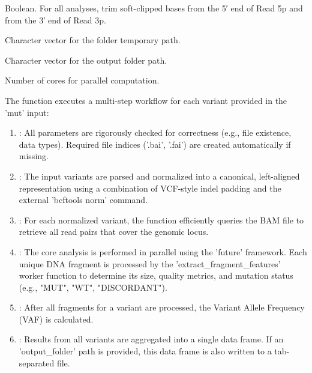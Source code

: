 \documentclass[a4paper]{book}
\begin{document}
\begin{Arguments}
\begin{ldescription}
\item[\code{remove\_softclip}] Boolean. For all analyses, trim soft-clipped bases from the 5′ end of Read 5p and from the 3′ end of Read 3p.

\item[\code{tmp\_folder}] Character vector for the folder temporary path.

\item[\code{output\_folder}] Character vector for the output folder path.

\item[\code{n\_cores}] Number of cores for parallel computation.
\end{ldescription}
\end{Arguments}
%
\begin{Details}
The function executes a multi-step workflow for each variant provided in the
'mut' input:
\begin{enumerate}

\item{} : All parameters are rigorously checked for correctness (e.g., file existence, data types).
Required file indices ('.bai', '.fai') are created automatically if missing.
\item{} : The input variants are parsed and normalized into a canonical, left-aligned
representation using a combination of VCF-style indel padding and the external 'bcftools norm' command.
\item{} : For each normalized variant, the function efficiently queries the BAM file to
retrieve all read pairs that cover the genomic locus.
\item{} : The core analysis is performed in parallel using the 'future' framework.
Each unique DNA fragment is processed by the 'extract\_fragment\_features' worker function to determine
its size, quality metrics, and mutation status (e.g., "MUT", "WT", "DISCORDANT").
\item{} : After all fragments for a variant are processed, the Variant Allele Frequency (VAF) is calculated.
\item{} : Results from all variants are aggregated into a single data frame. If an 'output\_folder'
path is provided, this data frame is also written to a tab-separated file.

\end{enumerate}

\end{Details}
\end{document}
